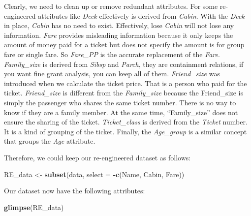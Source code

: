 \documentclass[
]{book}
\newenvironment{Shaded}{\begin{snugshade}}{\end{snugshade}}
\newcommand{\DataTypeTok}[1]{\textcolor[rgb]{0.13,0.29,0.53}{#1}}
\newcommand{\KeywordTok}[1]{\textcolor[rgb]{0.13,0.29,0.53}{\textbf{#1}}}
\newcommand{\NormalTok}[1]{#1}
\newcommand{\OperatorTok}[1]{\textcolor[rgb]{0.81,0.36,0.00}{\textbf{#1}}}
\newcommand{\StringTok}[1]{\textcolor[rgb]{0.31,0.60,0.02}{#1}}
\begin{document}
Clearly, we need to clean up or remove redundant attributes. For some re-engineered attributes like \emph{Deck} effectively is derived from \emph{Cabin}. With the \emph{Deck} in place, \emph{Cabin} has no need to exist. Effectively, lose \emph{Cabin} will not lose any information. \emph{Fare} provides misleading information because it only keeps the amount of money paid for a ticket but does not specify the amount is for group fare or single fare. So \emph{Fare\_PP} is the accurate replacement of the \emph{Fare}. \emph{Family\_size} is derived from \emph{Sibsp} and \emph{Parch}, they are containment relations, if you want fine grant analysis, you can keep all of them. \emph{Friend\_size} was introduced when we calculate the ticket price. That is a person who paid for the ticket. \emph{Friend\_size} is different from the \emph{Family\_size} because the Friend\_size is simply the passenger who shares the same ticket number. There is no way to know if they are a family member. At the same time, ``Family\_size'' does not ensure the sharing of the ticket. \emph{Ticket\_class} is derived from the \emph{Ticket} number. It is a kind of grouping of the ticket. Finally, the \emph{Age\_group} is a similar concept that groups the \emph{Age} attribute.

Therefore, we could keep our re-engineered dataset as follows:

\begin{Shaded}
\begin{Highlighting}[]
\NormalTok{RE_data <-}\StringTok{ }\KeywordTok{subset}\NormalTok{(data, }\DataTypeTok{select =} \OperatorTok{-}\KeywordTok{c}\NormalTok{(Name, Cabin, Fare))}
\end{Highlighting}
\end{Shaded}

Our dataset now have the following attributes:

\begin{Shaded}
\begin{Highlighting}[]
\KeywordTok{glimpse}\NormalTok{(RE_data)}
\end{Highlighting}
\end{Shaded}
\end{document}
